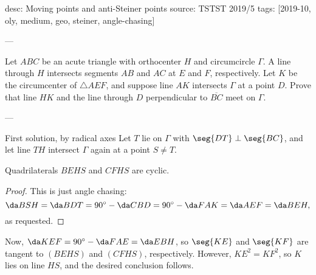 desc: Moving points and anti-Steiner points
source: TSTST 2019/5
tags: [2019-10, oly, medium, geo, steiner, angle-chasing]

---

Let $ABC$ be an acute triangle with orthocenter $H$ and circumcircle $\Gamma$. A line through $H$ intersects segments $AB$ and $AC$ at $E$ and $F$, respectively. Let $K$ be the circumcenter of $\triangle AEF$, and suppose line $AK$ intersects $\Gamma$ at a point $D$. Prove that line $HK$ and the line through $D$ perpendicular to $\overline{BC}$ meet on $\Gamma$.

---

\begin{customenv}{First solution, by radical axes}
    Let $T$ lie on $\Gamma$ with $\seg{DT}\perp\seg{BC}$, and let line $TH$ intersect $\Gamma$ again at a point $S\ne T$.
    \begin{iclaim*}
        Quadrilaterals $BEHS$ and $CFHS$ are cyclic.
    \end{iclaim*}
    \begin{proof}
        This is just angle chasing: \[\da BSH=\da BDT=90^\circ-\da CBD=90^\circ-\da FAK=\da AEF=\da BEH,\]
        as requested.
    \end{proof}

    Now, $\da KEF=90^\circ-\da FAE=\da EBH$, so $\seg{KE}$ and $\seg{KF}$ are tangent to $(BEHS)$ and $(CFHS)$, respectively. However, $KE^2=KF^2$, so $K$ lies on line $HS$, and the desired conclusion follows. 
\end{customenv}

